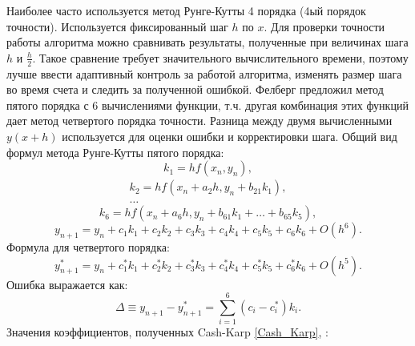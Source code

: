 Наиболее часто используется метод Рунге-Кутты 4 порядка (4ый порядок точности). Используется фиксированный шаг $h$ по $x$. Для проверки точности работы алгоритма можно сравнивать результаты, полученные при величинах шага $h$ и $\frac{h}{2}$. Такое сравнение требует значительного вычислительного времени, поэтому лучше ввести адаптивный контроль за работой алгоритма, изменять размер шага во время счета и следить за полученной ошибкой. Фелберг \cite{Press2002} предложил метод пятого порядка с 6 вычислениями функции, т.ч. другая комбинация этих функций дает метод четвертого порядка точности. Разница между двумя вычисленными $y(x+h)$ используется для оценки ошибки и корректировки шага. Общий вид формул метода Рунге-Кутты пятого порядка:
\begin{equation}
k_1=hf(x_n,y_n),
\end{equation}
\begin{equation}
\begin{split}
k_2=hf(x_n+a_2h,y_n+b_{21}k_1),\\
\dots
\end{split}
\end{equation}
\begin{equation}
k_6=hf(x_n+a_6h,y_n+b_{61}k_1+\dots+b_{65}k_5),
\end{equation}
\begin{equation}
y_{n+1}=y_n+c_1k_1+c_2k_2+c_3k_3+c_4k_4+c_5k_5+c_6k_6+O(h^6).
\end{equation}
Формула для четвертого порядка:
\begin{equation}
y_{n+1}^*=y_n+c_1^*k_1+c_2^*k_2+c_3^*k_3+c_4^*k_4+c_5^*k_5+c_6^*k_6+O(h^5).
\end{equation}
Ошибка выражается как:
\begin{equation}
\Delta\equiv y_{n+1}-y_{n+1}^*=\sum_{i=1}^6(c_i-c_i^*)k_i.
\end{equation}
Значения коэффициентов, полученных Cash-Karp \ref{Cash_Karp}, \cite{Press2002}:

